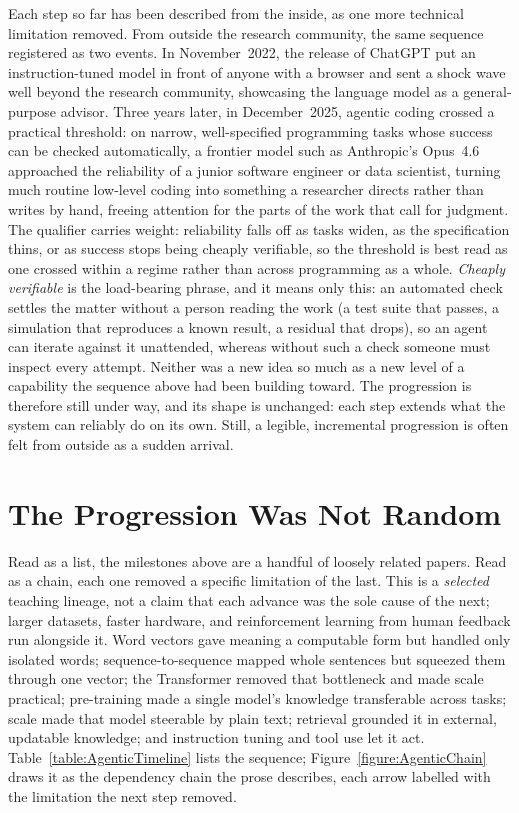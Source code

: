 Each step so far has been described from the inside, as one more technical limitation removed.
From outside the research community, the same sequence registered as two events.
In November~2022, the release of ChatGPT put an instruction-tuned model in front of anyone with a browser and sent a shock wave well beyond the research community, showcasing the language model as a general-purpose advisor.
Three years later, in December~2025, agentic coding crossed a practical threshold: on narrow, well-specified programming tasks whose success can be checked automatically, a frontier model such as Anthropic's Opus~4.6 approached the reliability of a junior software engineer or data scientist, turning much routine low-level coding into something a researcher directs rather than writes by hand, freeing attention for the parts of the work that call for judgment.
The qualifier carries weight: reliability falls off as tasks widen, as the specification thins, or as success stops being cheaply verifiable, so the threshold is best read as one crossed within a regime rather than across programming as a whole.
\emph{Cheaply verifiable} is the load-bearing phrase, and it means only this: an automated check settles the matter without a person reading the work (a test suite that passes, a simulation that reproduces a known result, a residual that drops), so an agent can iterate against it unattended, whereas without such a check someone must inspect every attempt.
Neither was a new idea so much as a new level of a capability the sequence above had been building toward.
The progression is therefore still under way, and its shape is unchanged: each step extends what the system can reliably do on its own.
Still, a legible, incremental progression is often felt from outside as a sudden arrival.

\section{The Progression Was Not Random}
\label{section:NotRandom}

Read as a list, the milestones above are a handful of loosely related papers.
Read as a chain, each one removed a specific limitation of the last.
This is a \emph{selected} teaching lineage, not a claim that each advance was the sole cause of the next; larger datasets, faster hardware, and reinforcement learning from human feedback run alongside it.
Word vectors gave meaning a computable form but handled only isolated words; sequence-to-sequence mapped whole sentences but squeezed them through one vector; the Transformer removed that bottleneck and made scale practical; pre-training made a single model's knowledge transferable across tasks; scale made that model steerable by plain text; retrieval grounded it in external, updatable knowledge; and instruction tuning and tool use let it act.
Table~\ref{table:AgenticTimeline} lists the sequence; Figure~\ref{figure:AgenticChain} draws it as the dependency chain the prose describes, each arrow labelled with the limitation the next step removed.

